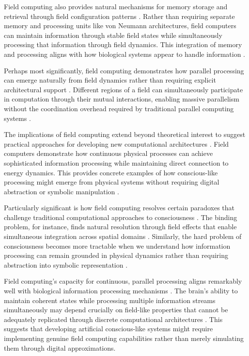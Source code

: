 Field computing also provides natural mechanisms for memory storage and retrieval through field configuration patterns \cite{Nikolic2019}. Rather than requiring separate memory and processing units like von Neumann architectures, field computers can maintain information through stable field states while simultaneously processing that information through field dynamics. This integration of memory and processing aligns with how biological systems appear to handle information \cite{Pockett2021}.

Perhaps most significantly, field computing demonstrates how parallel processing can emerge naturally from field dynamics rather than requiring explicit architectural support \cite{Pribram2017}. Different regions of a field can simultaneously participate in computation through their mutual interactions, enabling massive parallelism without the coordination overhead required by traditional parallel computing systems \cite{Raychowdhury2020}.

The implications of field computing extend beyond theoretical interest to suggest practical approaches for developing new computational architectures \cite{Verschure2019}. Field computers demonstrate how continuous physical processes can achieve sophisticated information processing while maintaining direct connection to energy dynamics. This provides concrete examples of how conscious-like processing might emerge from physical systems without requiring digital abstraction or symbolic manipulation \cite{Werbos2018}.

Particularly significant is how field computing resolves certain paradoxes that challenge traditional computational approaches to consciousness \cite{Bandyopadhyay2020}. The binding problem, for instance, finds natural resolution through field effects that enable simultaneous integration across spatial domains \cite{McFadden2002}. Similarly, the hard problem of consciousness becomes more tractable when we understand how information processing can remain grounded in physical dynamics rather than requiring abstraction into symbolic representation \cite{Calude2018b}.

Field computing's capacity for continuous, parallel processing aligns remarkably well with biological information processing mechanisms \cite{Chua2017}. The brain's ability to maintain coherent states while processing multiple information streams simultaneously may depend crucially on field-like properties that cannot be adequately replicated through discrete computational architectures \cite{Fromherz2019}. This suggests that developing artificial conscious-like systems might require implementing genuine field computing capabilities rather than merely simulating them through digital approximations.

